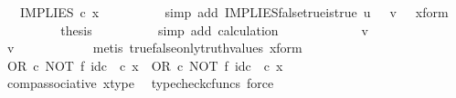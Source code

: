 \begin{isabellebody}
\ {\isachardoublequoteopen}{\isachardot}{\kern0pt}{\isachardot}{\kern0pt}{\isachardot}{\kern0pt}\ {\isacharequal}{\kern0pt}\ IMPLIES\ {\isasymcirc}\isactrlsub c\ x{\isachardoublequoteclose}\isanewline
\ \ \ \ \ \ \ \ \isamarkupfalse%
\ {\isacharparenleft}{\kern0pt}simp\ add{\isacharcolon}{\kern0pt}\ IMPLIES{\isacharunderscore}{\kern0pt}false{\isacharunderscore}{\kern0pt}true{\isacharunderscore}{\kern0pt}is{\isacharunderscore}{\kern0pt}true\ {\isacartoucheopen}u\ {\isacharequal}{\kern0pt}\ {\isasymf}{\isacartoucheclose}\ {\isacartoucheopen}v\ {\isacharequal}{\kern0pt}\ {\isasymt}{\isacartoucheclose}\ x{\isacharunderscore}{\kern0pt}form{\isacharparenright}{\kern0pt}\isanewline
\ \ \ \ \ \ \isamarkupfalse%
\ \isamarkupfalse%
\ {\isacharquery}{\kern0pt}thesis\isanewline
\ \ \ \ \ \ \ \ \isamarkupfalse%
\ {\isacharparenleft}{\kern0pt}simp\ add{\isacharcolon}{\kern0pt}\ calculation{\isacharparenright}{\kern0pt}\isanewline
\ \ \ \ \isamarkupfalse%
\isanewline
\ \ \ \ \ \ \isamarkupfalse%
\ {\isachardoublequoteopen}v\ {\isasymnoteq}\ {\isasymt}{\isachardoublequoteclose}\isanewline
\ \ \ \ \ \ \isamarkupfalse%
\ \isamarkupfalse%
\ {\isachardoublequoteopen}v\ {\isacharequal}{\kern0pt}\ {\isasymf}{\isachardoublequoteclose}\isanewline
\ \ \ \ \ \ \ \ \isamarkupfalse%
\ {\isacharparenleft}{\kern0pt}metis\ true{\isacharunderscore}{\kern0pt}false{\isacharunderscore}{\kern0pt}only{\isacharunderscore}{\kern0pt}truth{\isacharunderscore}{\kern0pt}values\ x{\isacharunderscore}{\kern0pt}form{\isacharparenright}{\kern0pt}\isanewline
\ \ \ \ \ \ \isamarkupfalse%
\ {\isachardoublequoteopen}{\isacharparenleft}{\kern0pt}OR\ {\isasymcirc}\isactrlsub c\ NOT\ {\isasymtimes}\isactrlsub f\ id\isactrlsub c\ {\isasymOmega}{\isacharparenright}{\kern0pt}\ {\isasymcirc}\isactrlsub c\ x\ {\isacharequal}{\kern0pt}\ OR\ {\isasymcirc}\isactrlsub c\ {\isacharparenleft}{\kern0pt}NOT\ {\isasymtimes}\isactrlsub f\ id\isactrlsub c\ {\isasymOmega}{\isacharparenright}{\kern0pt}\ {\isasymcirc}\isactrlsub c\ x{\isachardoublequoteclose}\isanewline
\ \ \ \ \ \ \ \ \isamarkupfalse%
\ comp{\isacharunderscore}{\kern0pt}associative{}\ x{\isacharunderscore}{\kern0pt}type\ \isamarkupfalse%
\ {\isacharparenleft}{\kern0pt}typecheck{\isacharunderscore}{\kern0pt}cfuncs{\isacharcomma}{\kern0pt}\ force{\isacharparenright}{\kern0pt}\isanewline
\ \ \ \ \ \ \isamarkupfalse%
\ \isamarkupfalse%

\end{isabellebody}
